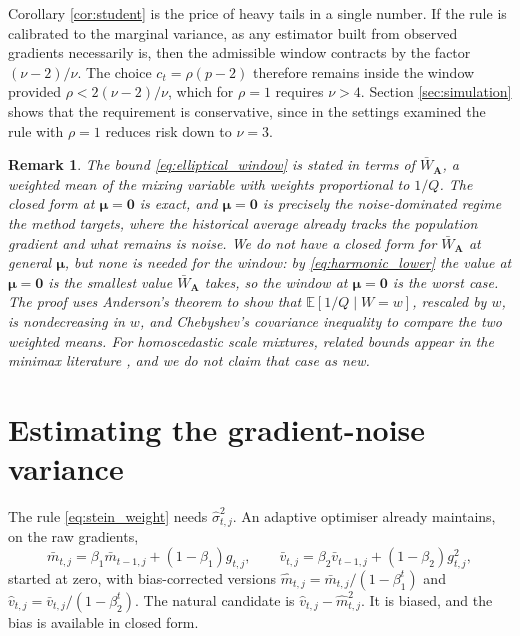 \documentclass[pdflatex,sn-mathphys-num]{sn-jnl}%
\theoremstyle{thmstyleone}%
\theoremstyle{thmstyletwo}%
\newtheorem{remark}{Remark}%
\theoremstyle{thmstylethree}%
\newcommand{\rev}[1]{#1}
\newcommand{\E}{\mathbb{E}}
\begin{document}
Corollary \ref{cor:student} is the price of heavy tails in a single number. If the rule is calibrated to the marginal variance, as any estimator built from observed gradients necessarily is, then the admissible window contracts by the factor $(\nu-2)/\nu$. The choice $c_t=\rho(p-2)$ therefore remains inside the window provided $\rho<2(\nu-2)/\nu$, which for $\rho=1$ requires $\nu>4$. Section \ref{sec:simulation} shows that the requirement is conservative, since in the settings examined the rule with $\rho=1$ reduces risk down to $\nu=3$.

\begin{remark}
The bound \eqref{eq:elliptical_window} is stated in terms of $\bar W_{\bm A}$, a weighted mean of the mixing variable with weights proportional to $1/Q$. The closed form at $\bm\mu=\bm 0$ is exact, and $\bm\mu=\bm 0$ is precisely the noise-dominated regime the method targets, where the historical average already tracks the population gradient and what remains is noise. \rev{We do not have a closed form for $\bar W_{\bm A}$ at general $\bm\mu$, but none is needed for the window: by \eqref{eq:harmonic_lower} the value at $\bm\mu=\bm 0$ is the smallest value $\bar W_{\bm A}$ takes, so the window at $\bm\mu=\bm 0$ is the worst case. The proof uses Anderson's theorem \cite{anderson1955} to show that $\E[1/Q\mid W=w]$, rescaled by $w$, is nondecreasing in $w$, and Chebyshev's covariance inequality to compare the two weighted means. For homoscedastic scale mixtures, related bounds appear in the minimax literature \cite{strawderman1974, fourdrinier2018}, and we do not claim that case as new.}
\end{remark}

\section{Estimating the gradient-noise variance}
\label{sec:variance}

The rule \eqref{eq:stein_weight} needs $\hat\sigma^2_{t,j}$. An adaptive optimiser already maintains, on the raw gradients,
\begin{equation}
\label{eq:moments}
\bar m_{t,j}=\beta_1\bar m_{t-1,j}+(1-\beta_1)g_{t,j},
\qquad
\bar v_{t,j}=\beta_2\bar v_{t-1,j}+(1-\beta_2)g^2_{t,j},
\end{equation}
started at zero, with bias-corrected versions $\hat m_{t,j}=\bar m_{t,j}/(1-\beta_1^{t})$ and $\hat v_{t,j}=\bar v_{t,j}/(1-\beta_2^{t})$. The natural candidate is $\hat v_{t,j}-\hat m^2_{t,j}$. It is biased, and the bias is available in closed form.
\end{document}
